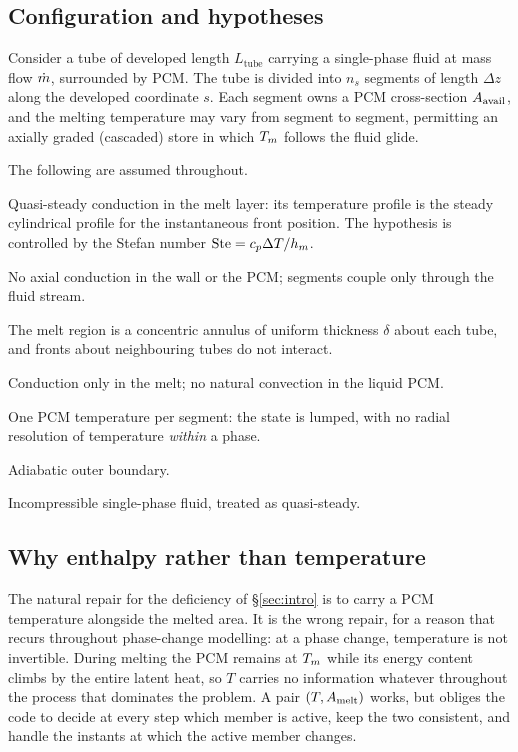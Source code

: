 \subsection{Configuration and hypotheses}

Consider a tube of developed length $L_{\mathrm{tube}}$ carrying a
single-phase fluid at mass flow $\dot m$, surrounded by PCM. The tube is divided
into $n_{s}$ segments of length $\Delta z$ along the developed coordinate $s$.
Each segment owns a PCM cross-section $A_{\mathrm{avail}}$, and the melting temperature may
vary from segment to segment, permitting an axially graded (cascaded) store in
which $T_{m}$ follows the fluid glide.

The following are assumed throughout.

\begin{description}[leftmargin=1.9em,itemsep=2pt]
\item[H1] Quasi-steady conduction in the melt layer: its temperature profile is
  the steady cylindrical profile for the instantaneous front position. The
  hypothesis is controlled by the Stefan number
  $\mathrm{Ste}=c_{p}\Delta T/h_{m}$.
\item[H2] No axial conduction in the wall or the PCM; segments couple only
  through the fluid stream.
\item[H3] The melt region is a concentric annulus of uniform thickness $\delta$
  about each tube, and fronts about neighbouring tubes do not interact.
\item[H4] Conduction only in the melt; no natural convection in the liquid PCM.
\item[H5] One PCM temperature per segment: the state is lumped, with no radial
  resolution of temperature \emph{within} a phase.
\item[H6] Adiabatic outer boundary.
\item[H7] Incompressible single-phase fluid, treated as quasi-steady.
\end{description}

\subsection{Why enthalpy rather than temperature}

The natural repair for the deficiency of \S\ref{sec:intro} is to carry a PCM
temperature alongside the melted area. It is the wrong repair, for a reason that
recurs throughout phase-change modelling: at a phase change, temperature is not
invertible. During melting the PCM remains at $T_{m}$ while its energy content
climbs by the entire latent heat, so $T$ carries no information whatever
throughout the process that dominates the problem. A pair $(T,A_{\mathrm{melt}})$ works,
but obliges the code to decide at every step which member is active, keep the
two consistent, and handle the instants at which the active member changes.

